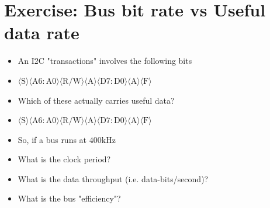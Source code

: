 \documentclass[10pt]{article}
\begin{document}
\section{Exercise: Bus bit rate vs Useful data rate}
\begin{itemize}
  \item An I2C "transactions" involves the following bits

  \item $\langle\mathrm{S}\rangle\langle\mathrm{A} 6: \mathrm{A} 0\rangle\langle\mathrm{R} / \mathrm{W}\rangle\langle\mathrm{A}\rangle\langle\mathrm{D} 7: \mathrm{D} 0\rangle\langle\mathrm{A}\rangle\langle\mathrm{F}\rangle$

  \item Which of these actually carries useful data?

  \item $\langle\mathrm{S}\rangle\langle\mathrm{A} 6: \mathrm{A} 0\rangle\langle\mathrm{R} / \mathrm{W}\rangle\langle\mathrm{A}\rangle\langle\mathrm{D} 7: \mathrm{D} 0\rangle\langle\mathrm{A}\rangle\langle\mathrm{F}\rangle$

  \item So, if a bus runs at $400 \mathrm{kHz}$

  \item What is the clock period?

  \item What is the data throughput (i.e. data-bits/second)?

  \item What is the bus "efficiency"?

\end{itemize}
\end{document}
